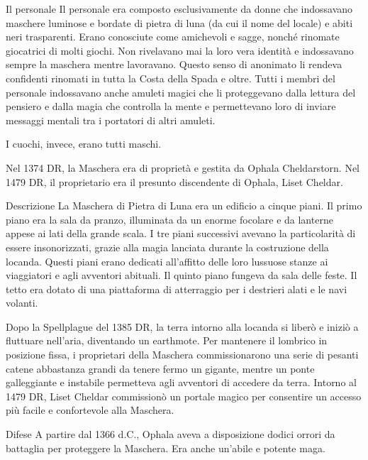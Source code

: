 \documentclass{article}
\begin{document}
Il personale\newline
Il personale era composto esclusivamente da donne che indossavano maschere luminose e bordate di pietra di luna (da cui il nome del locale) e abiti neri trasparenti. Erano conosciute come amichevoli e sagge, nonché rinomate giocatrici di molti giochi. Non rivelavano mai la loro vera identità e indossavano sempre la maschera mentre lavoravano. Questo senso di anonimato li rendeva confidenti rinomati in tutta la Costa della Spada e oltre. Tutti i membri del personale indossavano anche amuleti magici che li proteggevano dalla lettura del pensiero e dalla magia che controlla la mente e permettevano loro di inviare messaggi mentali tra i portatori di altri amuleti.

I cuochi, invece, erano tutti maschi.

Nel 1374 DR, la Maschera era di proprietà e gestita da Ophala Cheldarstorn. Nel 1479 DR, il proprietario era il presunto discendente di Ophala, Liset Cheldar.

Descrizione
La Maschera di Pietra di Luna era un edificio a cinque piani. Il primo piano era la sala da pranzo, illuminata da un enorme focolare e da lanterne appese ai lati della grande scala. I tre piani successivi avevano la particolarità di essere insonorizzati, grazie alla magia lanciata durante la costruzione della locanda. Questi piani erano dedicati all'affitto delle loro lussuose stanze ai viaggiatori e agli avventori abituali. Il quinto piano fungeva da sala delle feste. Il tetto era dotato di una piattaforma di atterraggio per i destrieri alati e le navi volanti.

Dopo la Spellplague del 1385 DR, la terra intorno alla locanda si liberò e iniziò a fluttuare nell'aria, diventando un earthmote. Per mantenere il lombrico in posizione fissa, i proprietari della Maschera commissionarono una serie di pesanti catene abbastanza grandi da tenere fermo un gigante, mentre un ponte galleggiante e instabile permetteva agli avventori di accedere da terra. Intorno al 1479 DR, Liset Cheldar commissionò un portale magico per consentire un accesso più facile e confortevole alla Maschera.

Difese
A partire dal 1366 d.C., Ophala aveva a disposizione dodici orrori da battaglia per proteggere la Maschera. Era anche un'abile e potente maga.
\end{document}
